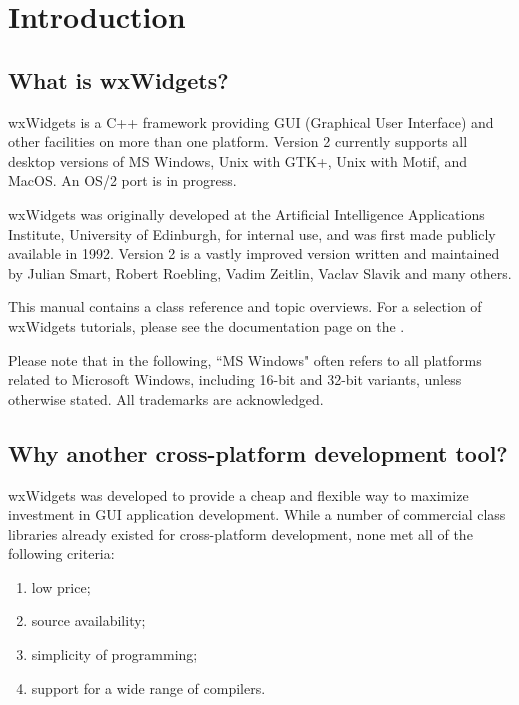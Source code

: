 \chapter{Introduction}\label{introduction}
%
%
\setfooter{\thepage}{}{}{}{}{\thepage}%

\section{What is wxWidgets?}

wxWidgets is a C++ framework providing GUI (Graphical User
Interface) and other facilities on more than one platform.  Version 2 currently
supports all desktop versions of MS Windows, Unix with GTK+, Unix with Motif,
and MacOS. An OS/2 port is in progress.

wxWidgets was originally developed at the Artificial Intelligence
Applications Institute, University of Edinburgh, for internal use,
and was first made publicly available in 1992.
Version 2 is a vastly improved version written and maintained by
Julian Smart, Robert Roebling, Vadim Zeitlin, Vaclav Slavik and many others.

This manual contains a class reference and topic overviews.
For a selection of wxWidgets tutorials, please see the documentation page on the .

Please note that in the following, ``MS Windows" often refers to all
platforms related to Microsoft Windows, including 16-bit and 32-bit
variants, unless otherwise stated. All trademarks are acknowledged.

\section{Why another cross-platform development tool?}

wxWidgets was developed to provide a cheap and flexible way to maximize
investment in GUI application development.  While a number of commercial
class libraries already existed for cross-platform development,
none met all of the following criteria:

\begin{enumerate}\itemsep=0pt
\item low price;
\item source availability;
\item simplicity of programming;
\item support for a wide range of compilers.
\end{enumerate}

